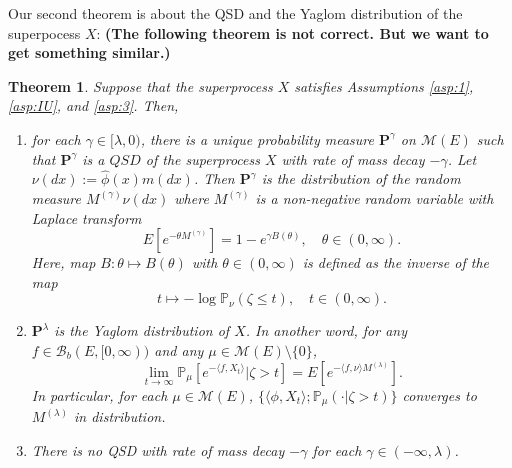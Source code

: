 \documentclass[12pt,a4paper]{amsart}
\numberwithin{equation}{section}
\theoremstyle{plain}
\newtheorem{thm}{Theorem}[section]
\theoremstyle{definition}
\begin{document}
Our second theorem is about the QSD and the Yaglom distribution of the superpocess $X$:
{\bf (The following theorem is not correct. But we want to get something similar.)}
\begin{thm}\label{thm:qsd_thm}
  Suppose that the superprocess $X$ satisfies Assumptions \ref{asp:1}, \ref{asp:IU}, and \ref{asp:3}.
  Then,
  \begin{enumerate}
  \item \label{thm:qsd_thm_1}
    for each $\gamma\in[\lambda,0)$, there is a unique probability measure ${\mathbf P}^{\gamma}$ on $\mathcal M(E)$ such that $ {\mathbf P}^\gamma$ is a $QSD$ of the superprocess $X$ with rate of mass decay $-\gamma$.
    Let $\nu(dx):=\widehat\phi(x) m(dx)$.
    Then ${\mathbf P}^\gamma$ is the distribution of the random measure $M^{(\gamma)}\nu(dx)$ where $M^{(\gamma)}$ is a non-negative random variable with Laplace transform
    \[
      E[e^{-\theta M^{(\gamma)}}]
      = 1 - e^{\gamma B(\theta)},
      \quad \theta \in (0,\infty).
    \]
    Here, map $B: \theta \mapsto B(\theta)$ with $\theta \in (0,\infty)$ is defined as the inverse of the map
    \[
      t
      \mapsto -\log \mathbb P_\nu(\zeta \leq t),
      \quad t\in (0,\infty).
    \]
  \item
    ${\mathbf P}^\lambda$ is the Yaglom distribution of $X$.
    In another word, for any  $f\in\mathcal B_b(E,[0,\infty))$ and any $\mu\in \mathcal M(E)\setminus\{0\}$,
    \[
      \lim_{t\rightarrow\infty}\mathbb P_{\mu}[e^{-\langle f,X_t\rangle} | \zeta>t]
      = E [e^{- \langle f,\nu\rangle M^{(\lambda)}}].
    \]
    In particular, for each $\mu \in \mathcal M(E)$, $\{\langle \phi, X_t\rangle; \mathbb P_{\mu}(\cdot| \zeta > t) \}$ converges to $M^{(\lambda)}$ in distribution.
  \item
    There is no QSD with rate of mass decay $-\gamma$ for each $\gamma\in(-\infty , \lambda)$.
  \end{enumerate}
\end{thm}
\end{document}
